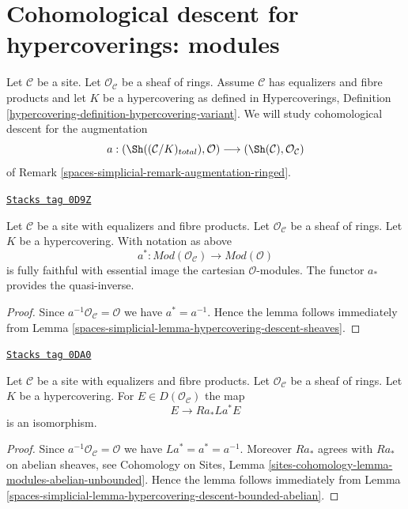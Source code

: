 \section{Cohomological descent for hypercoverings: modules}
\label{spaces-simplicial-section-cohomological-descent-hypercoverings-modules}
Let $\mathcal{C}$ be a site. Let $\mathcal{O}_\mathcal{C}$
be a sheaf of rings. Assume $\mathcal{C}$
has equalizers and fibre products and let $K$ be a hypercovering
as defined in Hypercoverings, Definition
\ref{hypercovering-definition-hypercovering-variant}. We will study
cohomological descent for the augmentation
$$
a :
(\Sh((\mathcal{C}/K)_{total}), \mathcal{O})
\longrightarrow
(\Sh(\mathcal{C}), \mathcal{O}_\mathcal{C})
$$
of Remark \ref{spaces-simplicial-remark-augmentation-ringed}.

\begin{lemma}
\label{spaces-simplicial-lemma-hypercovering-descent-modules}
\href{https://stacks.math.columbia.edu/tag/0D9Z}{\texttt{Stacks tag 0D9Z}}

Let $\mathcal{C}$ be a site with equalizers and fibre products.
Let $\mathcal{O}_\mathcal{C}$ be a sheaf of rings.
Let $K$ be a hypercovering. With notation as above
$$
a^* : \textit{Mod}(\mathcal{O}_\mathcal{C}) \to \textit{Mod}(\mathcal{O})
$$
is fully faithful with essential image the cartesian $\mathcal{O}$-modules.
The functor $a_*$ provides the quasi-inverse.
\end{lemma}

\begin{proof}
Since $a^{-1}\mathcal{O}_\mathcal{C} = \mathcal{O}$ we have
$a^* = a^{-1}$. Hence the lemma follows
immediately from Lemma \ref{spaces-simplicial-lemma-hypercovering-descent-sheaves}.
\end{proof}

\begin{lemma}
\label{spaces-simplicial-lemma-hypercovering-descent-bounded-modules}
\href{https://stacks.math.columbia.edu/tag/0DA0}{\texttt{Stacks tag 0DA0}}

Let $\mathcal{C}$ be a site with equalizers and fibre products.
Let $\mathcal{O}_\mathcal{C}$ be a sheaf of rings.
Let $K$ be a hypercovering. For
$E \in D(\mathcal{O}_\mathcal{C})$ the map
$$
E \longrightarrow Ra_*La^*E
$$
is an isomorphism.
\end{lemma}

\begin{proof}
Since $a^{-1}\mathcal{O}_\mathcal{C} = \mathcal{O}$ we have
$La^* = a^* = a^{-1}$. Moreover $Ra_*$ agrees with
$Ra_*$ on abelian sheaves, see
Cohomology on Sites, Lemma
\ref{sites-cohomology-lemma-modules-abelian-unbounded}.
Hence the lemma follows
immediately from Lemma \ref{spaces-simplicial-lemma-hypercovering-descent-bounded-abelian}.
\end{proof}

